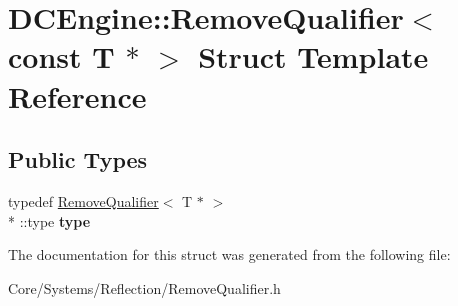 \hypertarget{structDCEngine_1_1RemoveQualifier_3_01const_01T_01_5_01_4}{\section{D\-C\-Engine\-:\-:Remove\-Qualifier$<$ const T $\ast$ $>$ Struct Template Reference}
\label{structDCEngine_1_1RemoveQualifier_3_01const_01T_01_5_01_4}
}
\subsection*{Public Types}
\begin{DoxyCompactItemize}
\item 
\hypertarget{structDCEngine_1_1RemoveQualifier_3_01const_01T_01_5_01_4_a7a3cc2bd6eeee789e3c4adb37a1306f9}{typedef \hyperlink{structDCEngine_1_1RemoveQualifier}{Remove\-Qualifier}$<$ T $\ast$ $>$\\*
\-::type {\bfseries type}}\label{structDCEngine_1_1RemoveQualifier_3_01const_01T_01_5_01_4_a7a3cc2bd6eeee789e3c4adb37a1306f9}

\end{DoxyCompactItemize}


The documentation for this struct was generated from the following file\-:\begin{DoxyCompactItemize}
\item 
Core/\-Systems/\-Reflection/Remove\-Qualifier.\-h\end{DoxyCompactItemize}

